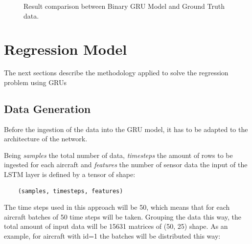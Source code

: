 \begin{figure}[H]
\begin{center}
\end{center}
\decoRule
\caption[Result comparison between Binary GRU Model and Ground Truth data]{Result comparison between Binary GRU Model and Ground Truth data.}
\label{fig:binary-gru-results}
\end{figure}


\section{Regression Model}

The next sections describe the methodology applied to solve the regression problem using GRUs


\subsection{Data Generation}

Before the ingestion of the data into the GRU model, it has to be adapted to the architecture of the network.

Being \textit{samples} the total number of data, \textit{timesteps} the amount of rows to be ingested for each aircraft and \textit{features} the number of sensor data the input of the LSTM layer is defined by a tensor of shape:

\begin{verbatim}
    (samples, timesteps, features)
\end{verbatim}

The time steps used in this approach will be 50, which means that for each aircraft batches of 50 time steps will be taken.
Grouping the data this way, the total amount of input data will be 15631 matrices of (50, 25) shape.
As an example, for aircraft with id=1 the batches will be distributed this way:

